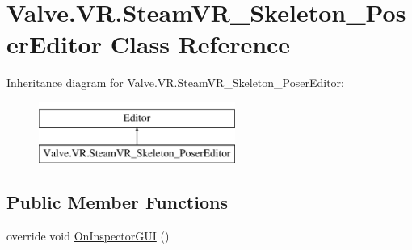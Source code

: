 \hypertarget{class_valve_1_1_v_r_1_1_steam_v_r___skeleton___poser_editor}{}\section{Valve.\+V\+R.\+Steam\+V\+R\+\_\+\+Skeleton\+\_\+\+Poser\+Editor Class Reference}
\label{class_valve_1_1_v_r_1_1_steam_v_r___skeleton___poser_editor}
Inheritance diagram for Valve.\+V\+R.\+Steam\+V\+R\+\_\+\+Skeleton\+\_\+\+Poser\+Editor\+:\begin{figure}[H]
\begin{center}
\leavevmode
\includegraphics[height=2.000000cm]{class_valve_1_1_v_r_1_1_steam_v_r___skeleton___poser_editor}
\end{center}
\end{figure}
\subsection*{Public Member Functions}
\begin{DoxyCompactItemize}
\item 
override void \mbox{\hyperlink{class_valve_1_1_v_r_1_1_steam_v_r___skeleton___poser_editor_a04b3335f0544e31c32be61f1ebc3a4ff}{On\+Inspector\+G\+UI}} ()
\end{DoxyCompactItemize}
